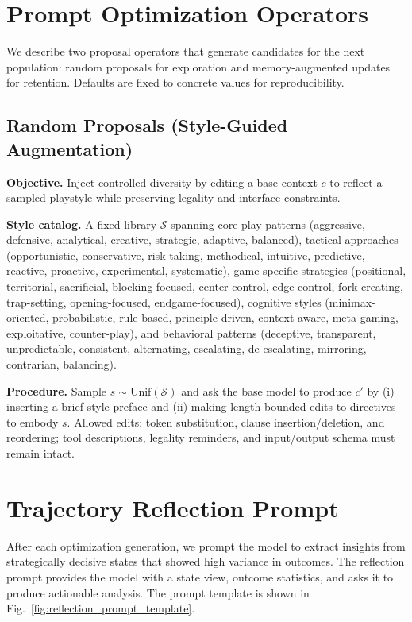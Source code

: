 \section{Prompt Optimization Operators}
\label{appendix:prompt-ops}
We describe two proposal operators that generate candidates for the next population: random proposals for exploration and memory-augmented updates for retention. Defaults are fixed to concrete values for reproducibility.

\subsection{Random Proposals (Style-Guided Augmentation)}
\label{appendix:prompt-ops-random}
\textbf{Objective.} Inject controlled diversity by editing a base context $c$ to reflect a sampled playstyle while preserving legality and interface constraints.

\textbf{Style catalog.} A fixed library $\mathcal{S}$ spanning core play patterns (aggressive, defensive, analytical, creative, strategic, adaptive, balanced), tactical approaches (opportunistic, conservative, risk-taking, methodical, intuitive, predictive, reactive, proactive, experimental, systematic), game-specific strategies (positional, territorial, sacrificial, blocking-focused, center-control, edge-control, fork-creating, trap-setting, opening-focused, endgame-focused), cognitive styles (minimax-oriented, probabilistic, rule-based, principle-driven, context-aware, meta-gaming, exploitative, counter-play), and behavioral patterns (deceptive, transparent, unpredictable, consistent, alternating, escalating, de-escalating, mirroring, contrarian, balancing).

\textbf{Procedure.} Sample $s\sim\mathrm{Unif}(\mathcal{S})$ and ask the base model to produce $c'$ by (i) inserting a brief style preface and (ii) making length-bounded edits to directives to embody $s$. Allowed edits: token substitution, clause insertion/deletion, and reordering; tool descriptions, legality reminders, and input/output schema must remain intact.



\section{Trajectory Reflection Prompt}
\label{appendix:reflection-prompt}

After each optimization generation, we prompt the model to extract insights from strategically decisive states that showed high variance in outcomes. The reflection prompt provides the model with a state view, outcome statistics, and asks it to produce actionable analysis. The prompt template is shown in Fig.~\ref{fig:reflection_prompt_template}.

